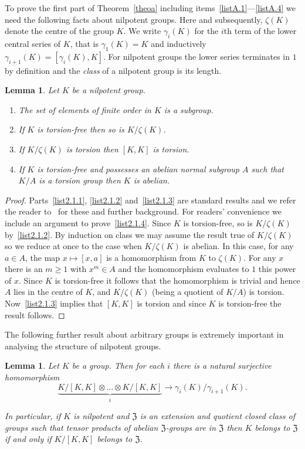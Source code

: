\documentclass[11pt]{article}
\newtheorem{lemm}[theo]{Lemma}
\theoremstyle{definition}
\numberwithin{equation}{section}
\numberwithin{figure}{section}
\numberwithin{table}{section}
\newcommand*{\romanenumi}{\renewcommand*{\theenumi}{\roman{enumi}}}
\begin{document}
To prove the first part of Theorem~\ref{theoa} including items~\eqref{listA.1}---\eqref{listA.4} we need the following facts about nilpotent groups. Here and subsequently, $\zeta(K)$ denote the centre of the group $K$. We write $\gamma_i(K)$ for the $i$th term of the lower central series of $K$, that is $\gamma_1(K)=K$ and inductively $\gamma_{i+1}(K)=[\gamma_i(K),K]$. For nilpotent groups the lower series terminates in $1$ by definition and the \emph{class} of a nilpotent group is its length.

\begin{lemm}\label{lem2.1}
Let $K$ be a nilpotent group.
\begin{enumerate}\romanenumi
\item \label{list2.1.1}The set of elements of finite order in $K$ is a subgroup.
\item \label{list2.1.2}If $K$ is torsion-free then so is $K/\zeta(K)$.
\item \label{list2.1.3}If $K/\zeta(K)$ is torsion then $[K,K]$ is torsion.
\item \label{list2.1.4}If $K$ is torsion-free and possesses an abelian normal subgroup $A$ such that $K/A$ is a torsion group then $K$ is abelian.
\end{enumerate}
\end{lemm}
\begin{proof}
Parts~\eqref{list2.1.1}, \eqref{list2.1.2} and~\eqref{list2.1.3} are standard results and we refer the reader to~\cite{Rob96} for these and further background. For readers' convenience we include an argument to prove~\eqref{list2.1.4}. Since $K$ is torsion-free, so is $K/\zeta(K)$ by~\eqref{list2.1.2}. By induction on class we may assume the result true of $K/\zeta(K)$ so we reduce at once to the case when $K/\zeta(K)$ is abelian. In this case, for any $a\in A$, the map $x\mapsto[x,a]$ is a homomorphism from $K$ to $\zeta(K)$. For any $x$ there is an $m\ge1$ with $x^m\in A$ and the homomorphism evaluates to $1$ this power of $x$. Since $K$ is torsion-free it follows that the homomorphism is trivial and hence $A$ lies in the centre of $K$, and $K/\zeta(K)$ (being a quotient of $K/A$) is torsion. Now~\eqref{list2.1.3} implies that $[K,K]$ is torsion and since $K$ is torsion-free the result follows.
\end{proof}

The following further result about arbitrary groups is extremely important in analysing the structure of nilpotent groups.

\begin{lemm}\label{lem2.2}
Let $K$ be a group. Then for each $i$ there is a natural surjective homomorphism
\[
\underbrace{K/[K,K]\otimes\dots\otimes K/[K,K]}_i\to
\gamma_i(K)/\gamma_{i+1}(K).
\]

In particular, if $K$ is nilpotent and $\mathfrak Z$ is an extension and quotient closed class of groups such that tensor products of abelian $\mathfrak Z$-groups are in $\mathfrak Z$ then $K$ belongs to $\mathfrak Z$ if and only if $K/[K,K]$ belongs to $\mathfrak Z$.
\end{lemm}
\end{document}
